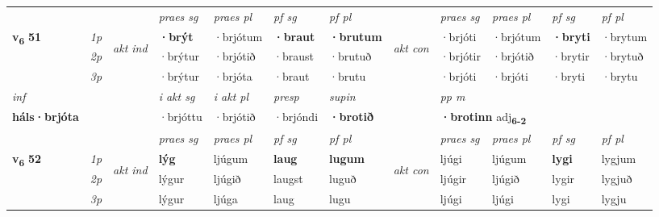 \begin{longtable}[l]{X>{\footnotesize\itshape}llXXXXlXXXX}
 & &   & \textit{praes sg}  & \textit{praes pl}    & \textit{ pf sg} & \textit{pf pl} & & \textit{praes sg}  & \textit{praes pl}    & \textit{pf sg} & \textit{pf pl }  \\ \cmidrule{4-7} \cmidrule{9-12}
 \multirow{2}{*}{{{\textbf{v{\textsubscript{6}}} \Large{\textbf{51}}}}}  & 1p & \multirow{3}{*}{\begin{turn}{90}\textit{akt ind}\end{turn}} & \textbf{·brýt} & ·brjótum & \textbf{·braut} & \textbf{·brutum} & \multirow{3}{*}{\begin{turn}{90}\textit{akt con}\end{turn}} &·brjóti & ·brjótum & \textbf{·bryti} & ·brytum\\*
 & 2p &  &  ·brýtur  & ·brjótið & ·braust & ·brutuð & & ·brjótir & ·brjótið & ·brytir & ·brytuð \\*
 & 3p &  & ·brýtur & ·brjóta & ·braut & ·brutu & & ·brjóti & ·brjóti& ·bryti & ·brytu \\*
\cmidrule{4-7} \cmidrule{9-12}

   {\textit{inf}} & &  & \textit{i akt sg} & \textit{i akt pl}   & \textit{presp} & \textit{supin}  && \textit{pp m} \\*
  {\textbf{háls\allowbreak ·brjóta}} & && ·brjóttu  & ·brjótið   & ·brjóndi &  \textbf{·brotið}  && \multicolumn{2}{l}{\textbf{·brotinn} adj\textbf{\textsubscript{6-2}}} \\*

\midrule

 & &   & \textit{praes sg}  & \textit{praes pl}    & \textit{ pf sg} & \textit{pf pl} & & \textit{praes sg}  & \textit{praes pl}    & \textit{pf sg} & \textit{pf pl }  \\ \cmidrule{4-7} \cmidrule{9-12}
 \multirow{2}{*}{{{\textbf{v{\textsubscript{6}}} \Large{\textbf{52}}}}}  & 1p & \multirow{3}{*}{\begin{turn}{90}\textit{akt ind}\end{turn}} & \textbf{lýg} & ljúgum & \textbf{laug} & \textbf{lugum} & \multirow{3}{*}{\begin{turn}{90}\textit{akt con}\end{turn}} &ljúgi & ljúgum & \textbf{lygi} & lygjum\\*
 & 2p &  &  lýgur  & ljúgið & laugst & luguð & & ljúgir & ljúgið & lygir & lygjuð \\*
 & 3p &  & lýgur & ljúga & laug & lugu & & ljúgi & ljúgi& lygi & lygju \\*
\cmidrule{4-7} \cmidrule{9-12}


\end{longtable}
